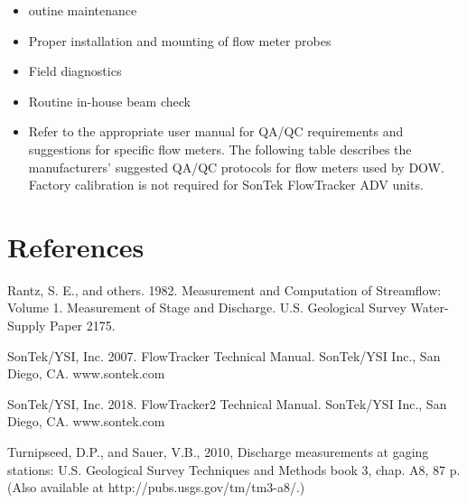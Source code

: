 \documentclass[12pt]{../SOP3_beta}\usepackage[]{graphicx}\usepackage[]{xcolor}
\begin{document}
\begin{itemize}

\item outine maintenance
\item Proper installation and mounting of flow meter probes
\item Field diagnostics

\item Routine in-house beam check
\item Refer to the appropriate user manual for QA/QC requirements and suggestions for
specific flow meters. The following table describes the manufacturers’ suggested
QA/QC protocols for flow meters used by DOW. Factory calibration is not required for
SonTek FlowTracker ADV units.

\end{itemize}

\section{References}

\NP Rantz, S. E., and others. 1982. Measurement and Computation of Streamflow: Volume
1. Measurement of Stage and Discharge. U.S. Geological Survey Water-Supply
Paper 2175.

\NP SonTek/YSI, Inc. 2007. FlowTracker Technical Manual. SonTek/YSI Inc., San Diego, CA. www.sontek.com

\NP SonTek/YSI, Inc. 2018. FlowTracker2 Technical Manual. SonTek/YSI Inc., San Diego, CA. www.sontek.com

\NP Turnipseed, D.P., and Sauer, V.B., 2010, Discharge measurements at gaging stations: U.S. Geological Survey Techniques and Methods book 3, chap. A8, 87 p. (Also
available at http://pubs.usgs.gov/tm/tm3-a8/.)

\end{document}
